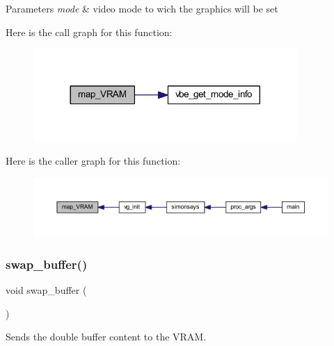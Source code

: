 \begin{DoxyParams}{Parameters}
{\em mode} & video mode to wich the graphics will be set \\
\hline
\end{DoxyParams}
Here is the call graph for this function\+:\nopagebreak
\begin{figure}[H]
\begin{center}
\leavevmode
\includegraphics[width=284pt]{group__video__gr_ga06d4b54021d33d2447a61b9de3982810_cgraph}
\end{center}
\end{figure}
Here is the caller graph for this function\+:\nopagebreak
\begin{figure}[H]
\begin{center}
\leavevmode
\includegraphics[width=350pt]{group__video__gr_ga06d4b54021d33d2447a61b9de3982810_icgraph}
\end{center}
\end{figure}
\mbox{\label{group__video__gr_gad42c7cf5f54fed0714fcf1f6e5e35bee}} 
\subsubsection{\texorpdfstring{swap\+\_\+buffer()}{swap\_buffer()}}
{\footnotesize\ttfamily void swap\+\_\+buffer (\begin{DoxyParamCaption}{ }\end{DoxyParamCaption})}



Sends the double buffer content to the V\+R\+AM. 

